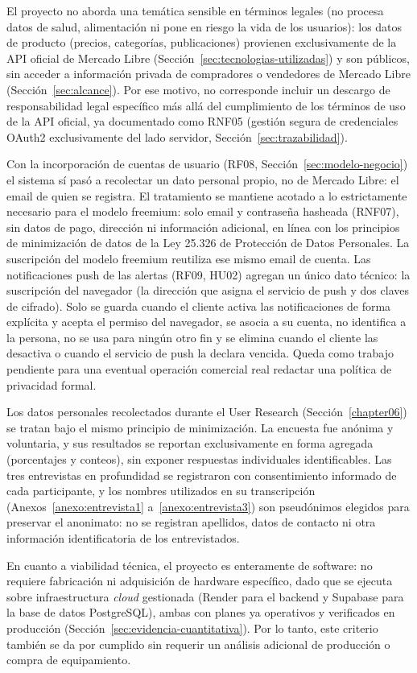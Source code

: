El proyecto no aborda una temática sensible en términos legales (no procesa datos de salud, alimentación ni pone en riesgo la vida de los usuarios): los datos de producto (precios, categorías, publicaciones) provienen exclusivamente de la API oficial de Mercado Libre (Sección~\ref{sec:tecnologias-utilizadas}) y son públicos, sin acceder a información privada de compradores o vendedores de Mercado Libre (Sección~\ref{sec:alcance}). Por ese motivo, no corresponde incluir un descargo de responsabilidad legal específico más allá del cumplimiento de los términos de uso de la API oficial, ya documentado como RNF05 (gestión segura de credenciales OAuth2 exclusivamente del lado servidor, Sección~\ref{sec:trazabilidad}).

Con la incorporación de cuentas de usuario (RF08, Sección~\ref{sec:modelo-negocio}) el sistema sí pasó a recolectar un dato personal propio, no de Mercado Libre: el email de quien se registra. El tratamiento se mantiene acotado a lo estrictamente necesario para el modelo freemium: solo email y contraseña hasheada (RNF07), sin datos de pago, dirección ni información adicional, en línea con los principios de minimización de datos de la Ley 25.326 de Protección de Datos Personales. La suscripción del modelo freemium reutiliza ese mismo email de cuenta. Las notificaciones push de las alertas (RF09, HU02) agregan un único dato técnico: la suscripción del navegador (la dirección que asigna el servicio de push y dos claves de cifrado). Solo se guarda cuando el cliente activa las notificaciones de forma explícita y acepta el permiso del navegador, se asocia a su cuenta, no identifica a la persona, no se usa para ningún otro fin y se elimina cuando el cliente las desactiva o cuando el servicio de push la declara vencida. Queda como trabajo pendiente para una eventual operación comercial real redactar una política de privacidad formal.

Los datos personales recolectados durante el User Research (Sección~\ref{chapter06}) se tratan bajo el mismo principio de minimización. La encuesta fue anónima y voluntaria, y sus resultados se reportan exclusivamente en forma agregada (porcentajes y conteos), sin exponer respuestas individuales identificables. Las tres entrevistas en profundidad se registraron con consentimiento informado de cada participante, y los nombres utilizados en su transcripción (Anexos~\ref{anexo:entrevista1} a~\ref{anexo:entrevista3}) son pseudónimos elegidos para preservar el anonimato: no se registran apellidos, datos de contacto ni otra información identificatoria de los entrevistados.

En cuanto a viabilidad técnica, el proyecto es enteramente de software: no requiere fabricación ni adquisición de hardware específico, dado que se ejecuta sobre infraestructura \emph{cloud} gestionada (Render para el backend y Supabase para la base de datos PostgreSQL), ambas con planes ya operativos y verificados en producción (Sección~\ref{sec:evidencia-cuantitativa}). Por lo tanto, este criterio también se da por cumplido sin requerir un análisis adicional de producción o compra de equipamiento.
